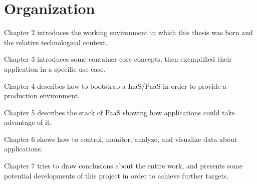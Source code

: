 \section{Organization}\label{organization}

Chapter 2 introduces the working environment in which this thesis was born and the relative technological context.

Chapter 3 introduces some container core concepts, then exemplified their application in a specific use case.

Chapter 4 describes how to bootstrap a IaaS/PaaS in order to provide a production environment.

Chapter 5 describes the stack of PaaS showing how applications could take advantage of it.

Chapter 6 shows how to control, monitor, analyze, and visualize data
about applications.

Chapter 7 tries to draw conclusions about the entire work, and presents some potential developments of this project in order to achieve further targets.